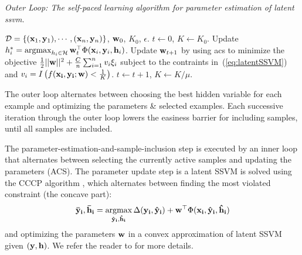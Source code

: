 \documentclass{article}
\newcommand{\mytopcaption}[1]{\caption{\em \footnotesize #1}}
\newcommand{\argmax}{\operatornamewithlimits{argmax}}
\newcommand{\mthb }{\begin{eqnarray*} }
\newcommand{\mthe }{\end {eqnarray*} }
\begin{document}
\begin{algorithm}[h!]
\mytopcaption{Outer Loop: The self-paced learning algorithm for parameter estimation of latent {\sc ssvm}.}
\label{algo:selfPacedLatentSSVM}
\begin{algorithmic}[1]
\INPUT ${\cal D} = \{({\bf x}_1,{\bf y}_1),\cdots,({\bf x}_n,{\bf y}_n)\}$, ${\bf w}_0$, $K_0$, $\epsilon$.
\STATE $t \leftarrow 0$, $K \leftarrow K_0$.
\REPEAT
\STATE Update $h_i^* = \argmax_{h_i \in {\cal H}} {\bf w}_{t}^\top \Phi({\bf x}_i,{\bf y}_i,{\bf h}_i)$.
\STATE Update ${\bf w}_{t+1}$ by using {\sc acs} to minimize the objective
$\frac{1}{2}||{\bf w}||^2 + \frac{C}{n} \sum_{i=1}^n v_i\xi_i$ subject to the contraints in~(\ref{eq:latentSSVM}) and $v_i=I\left(f({\bf x_i,\bf y_i;\bf w}) < \frac{1}{K}\right)$.
\STATE $t \leftarrow t + 1$, $K \leftarrow K/\mu$.
\end{algorithmic}
\end{algorithm}

The outer loop alternates between choosing the best hidden variable for each example and optimizing the parameters \& selected examples.  Each successive iteration through the outer loop lowers the easiness barrier for including samples, until all samples are included.

The parameter-estimation-and-sample-inclusion step is executed by an inner loop that alternates between selecting the currently active samples and updating the parameters ({\sc ACS}).  The parameter update step is a latent SSVM is solved using the {\sc CCCP} algorithm \cite{SSVM}, which alternates between finding the most violated constraint (the concave part):
\mthb
{\bf\bar y_i,\bf\bar h_i} = \argmax_{{\bf\hat y_i},{\bf\hat h_i}} \Delta({\bf y_i,\bf\hat y_i})+{\bf w}^\top\Phi(\bf x_i,\bf\hat y_i,\bf\hat h_i)
\mthe
and optimizing the parameters $\bf w$ in a convex approximation of latent SSVM given $(\bf y, \bf h)$.  We refer the reader to \cite{SSVM} for more details.
\end{document}
